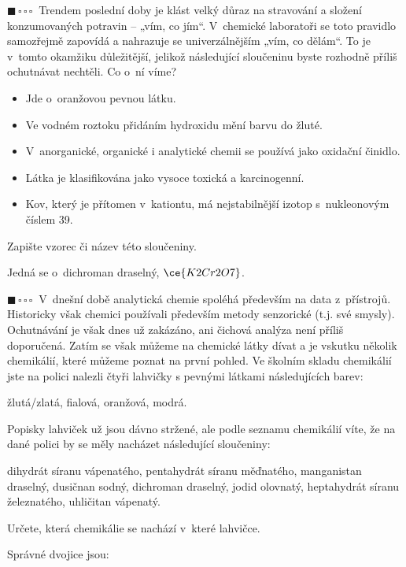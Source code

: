 \documentclass{book}
\newcommand{\jeden}{$\blacksquare \, \square \, \square \, \square \; \; $}
\renewenvironment{quotation}{\par}{\par} %
\begin{document}
\begin{quotation}
\jeden Trendem poslední doby je klást velký důraz na stravování a složení
konzumovaných potravin -- „vím, co jím“. V~chemické laboratoři se
toto pravidlo samozřejmě zapovídá a nahrazuje se univerzálnějším „vím,
co dělám“. To je v~tomto okamžiku důležitější, jelikož následující
sloučeninu byste rozhodně příliš ochutnávat nechtěli. Co o~ní víme?
\begin{itemize}
\item Jde o~oranžovou pevnou látku.
\item Ve vodném roztoku přidáním hydroxidu mění barvu do žluté.
\item V~anorganické, organické i analytické chemii se používá jako oxidační
činidlo.
\item Látka je klasifikována jako vysoce toxická a karcinogenní.
\item Kov, který je přítomen v~kationtu, má nejstabilnější izotop s~nukleonovým
číslem 39.
\end{itemize}
Zapište vzorec či název této sloučeniny.
\end{quotation} \dotfill \par 
Jedná se o~dichroman draselný, $\ce{K2Cr2O7}$.

\hrulefill %
\begin{quotation}
\jeden V~dnešní době analytická chemie spoléhá především na data z~přístrojů.
Historicky však chemici používali především metody senzorické (t.j.
své smysly). Ochutnávání je však dnes už zakázáno, ani čichová analýza
není příliš doporučená. Zatím se však můžeme na chemické látky dívat
a je vskutku několik chemikálií, které můžeme poznat na první pohled.
Ve školním skladu chemikálií jste na polici nalezli čtyři lahvičky
s pevnými látkami následujících barev:

žlutá/zlatá, fialová, oranžová, modrá.

Popisky lahviček už jsou dávno stržené, ale podle seznamu chemikálií
víte, že na dané polici by se měly nacházet následující sloučeniny:

dihydrát síranu vápenatého, pentahydrát síranu měďnatého, manganistan
draselný, dusičnan sodný, dichroman draselný, jodid olovnatý, heptahydrát
síranu železnatého, uhličitan vápenatý.

Určete, která chemikálie se nachází v~které lahvičce.
\end{quotation} \dotfill \par 
Správné dvojice jsou:
\end{document}
